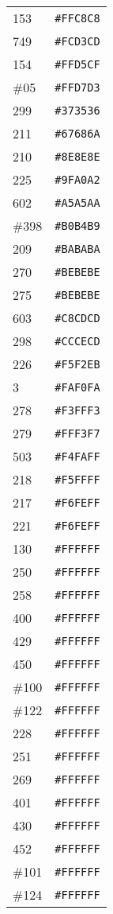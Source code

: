 \documentclass[a4paper]{article}
\begin{document}
\begin{longtable}{|l|r|}
153 & \texttt{\#FFC8C8} \\
749 & \texttt{\#FCD3CD} \\
154 & \texttt{\#FFD5CF} \\
\#05 & \texttt{\#FFD7D3} \\
299 & \texttt{\#373536} \\
211 & \texttt{\#67686A} \\
210 & \texttt{\#8E8E8E} \\
225 & \texttt{\#9FA0A2} \\
602 & \texttt{\#A5A5AA} \\
\#398 & \texttt{\#B0B4B9} \\
209 & \texttt{\#BABABA} \\
270 & \texttt{\#BEBEBE} \\
275 & \texttt{\#BEBEBE} \\
603 & \texttt{\#C8CDCD} \\
298 & \texttt{\#CCCECD} \\
226 & \texttt{\#F5F2EB} \\
3 & \texttt{\#FAF0FA} \\
278 & \texttt{\#F3FFF3} \\
279 & \texttt{\#FFF3F7} \\
503 & \texttt{\#F4FAFF} \\
218 & \texttt{\#F5FFFF} \\
217 & \texttt{\#F6FEFF} \\
221 & \texttt{\#F6FEFF} \\
130 & \texttt{\#FFFFFF} \\
250 & \texttt{\#FFFFFF} \\
258 & \texttt{\#FFFFFF} \\
400 & \texttt{\#FFFFFF} \\
429 & \texttt{\#FFFFFF} \\
450 & \texttt{\#FFFFFF} \\
\#100 & \texttt{\#FFFFFF} \\
\#122 & \texttt{\#FFFFFF} \\
228 & \texttt{\#FFFFFF} \\
251 & \texttt{\#FFFFFF} \\
269 & \texttt{\#FFFFFF} \\
401 & \texttt{\#FFFFFF} \\
430 & \texttt{\#FFFFFF} \\
452 & \texttt{\#FFFFFF} \\
\#101 & \texttt{\#FFFFFF} \\
\#124 & \texttt{\#FFFFFF} \\

\end{longtable}
\end{document}
